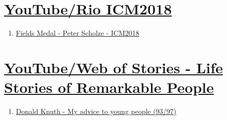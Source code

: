 \documentclass{book}
\numberwithin{equation}{section}
\begin{document}

\chapter{\href{https://www.youtube.com/channel/UCnMLdlOoLICBNcEzjMLOc7w}{YouTube/Rio ICM2018}}

\begin{enumerate}
    \item \href{https://www.youtube.com/watch?v=yEVlCZTqht8}{Fields Medal - Peter Scholze - ICM2018}
\end{enumerate}


\chapter{\href{https://www.youtube.com/channel/UCrN1lcGgsCB9axGjZjpOqiQ}{YouTube/Web of Stories - Life Stories of Remarkable People}}

\begin{enumerate}
    \item \href{https://www.youtube.com/watch?v=75Ju0eM5T2c}{Donald Knuth - My advice to young people (93/97)}
\end{enumerate}


\printbibliography[heading=bibintoc]
\end{document}
